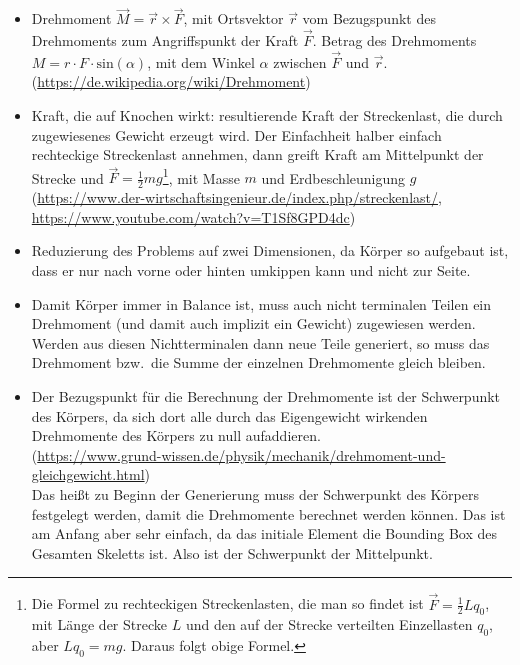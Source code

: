   \begin{itemize}
   \item Drehmoment $\vec{M} = \vec{r} \times \vec{F}$, mit Ortsvektor $\vec{r}$ vom Bezugspunkt des Drehmoments zum Angriffspunkt der Kraft $\vec{F}$. Betrag des Drehmoments $M = r \cdot F \cdot \textrm{sin}(\alpha)$, mit dem Winkel $\alpha$ zwischen $\vec{F}$ und $\vec{r}$.\\
   (\url{https://de.wikipedia.org/wiki/Drehmoment})
   
   \item Kraft, die auf Knochen wirkt: resultierende Kraft der Streckenlast, die durch zugewiesenes Gewicht erzeugt wird. Der Einfachheit halber einfach rechteckige Streckenlast annehmen, dann greift Kraft am Mittelpunkt der Strecke und $\vec{F} = \frac{1}{2} m g$\footnote{Die Formel zu rechteckigen Streckenlasten, die man so findet ist $\vec{F} = \frac{1}{2} L q_0$, mit Länge der Strecke $L$ und den auf der Strecke verteilten Einzellasten $q_0$, aber $L q_0 = m g$. Daraus folgt obige Formel.}, mit Masse $m$ und Erdbeschleunigung $g$\\ (\url{https://www.der-wirtschaftsingenieur.de/index.php/streckenlast/}, \url{https://www.youtube.com/watch?v=T1Sf8GPD4dc})
   
   \item Reduzierung des Problems auf zwei Dimensionen, da Körper so aufgebaut ist, dass er nur nach vorne oder hinten umkippen kann und nicht zur Seite.
   
   \item Damit Körper immer in Balance ist, muss auch nicht terminalen Teilen ein Drehmoment (und damit auch implizit ein Gewicht) zugewiesen werden. Werden aus diesen Nichtterminalen dann neue Teile generiert, so muss das Drehmoment bzw.\ die Summe der einzelnen Drehmomente gleich bleiben.
   
   \item Der Bezugspunkt für die Berechnung der Drehmomente ist der Schwerpunkt des Körpers, da sich dort alle durch das Eigengewicht wirkenden Drehmomente des Körpers zu null aufaddieren.\\ (\url{https://www.grund-wissen.de/physik/mechanik/drehmoment-und-gleichgewicht.html})\\
   Das heißt zu Beginn der Generierung muss der Schwerpunkt des Körpers festgelegt werden, damit die Drehmomente berechnet werden können. Das ist am Anfang aber sehr einfach, da das initiale Element die Bounding Box des Gesamten Skeletts ist. Also ist der Schwerpunkt der Mittelpunkt.
   
  \end{itemize}


